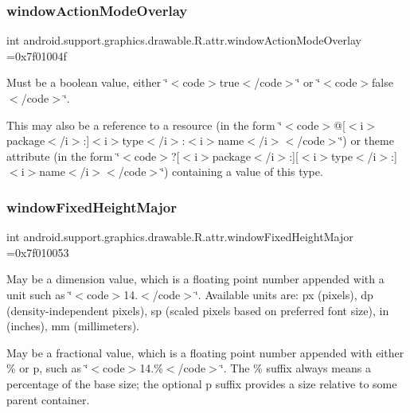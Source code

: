 \subsubsection{\texorpdfstring{window\+Action\+Mode\+Overlay}{windowActionModeOverlay}}
{\footnotesize\ttfamily int android.\+support.\+graphics.\+drawable.\+R.\+attr.\+window\+Action\+Mode\+Overlay =0x7f01004f\hspace{0.3cm}{\ttfamily [static]}}

Must be a boolean value, either \char`\"{}$<$code$>$true$<$/code$>$\char`\"{} or \char`\"{}$<$code$>$false$<$/code$>$\char`\"{}. 

This may also be a reference to a resource (in the form \char`\"{}$<$code$>$@\mbox{[}$<$i$>$package$<$/i$>$\+:\mbox{]}$<$i$>$type$<$/i$>$\+:$<$i$>$name$<$/i$>$$<$/code$>$\char`\"{}) or theme attribute (in the form \char`\"{}$<$code$>$?\mbox{[}$<$i$>$package$<$/i$>$\+:\mbox{]}\mbox{[}$<$i$>$type$<$/i$>$\+:\mbox{]}$<$i$>$name$<$/i$>$$<$/code$>$\char`\"{}) containing a value of this type. \mbox{\label{classandroid_1_1support_1_1graphics_1_1drawable_1_1R_1_1attr_a4454ae1ef8a4e86e5b082c9ec101eb7f}} 
\subsubsection{\texorpdfstring{window\+Fixed\+Height\+Major}{windowFixedHeightMajor}}
{\footnotesize\ttfamily int android.\+support.\+graphics.\+drawable.\+R.\+attr.\+window\+Fixed\+Height\+Major =0x7f010053\hspace{0.3cm}{\ttfamily [static]}}

May be a dimension value, which is a floating point number appended with a unit such as \char`\"{}$<$code$>$14.\+5sp$<$/code$>$\char`\"{}. Available units are\+: px (pixels), dp (density-\/independent pixels), sp (scaled pixels based on preferred font size), in (inches), mm (millimeters). 

May be a fractional value, which is a floating point number appended with either \% or p, such as \char`\"{}$<$code$>$14.\%$<$/code$>$\char`\"{}. The \% suffix always means a percentage of the base size; the optional p suffix provides a size relative to some parent container. 

